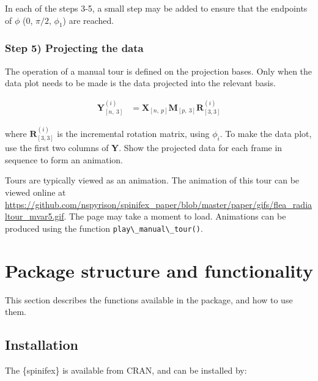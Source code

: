 \documentclass{template/monashthesis}
\begin{document}
In each of the steps 3-5, a small step may be added to ensure that the endpoints of \(\phi\) (\(0\), \(\pi/2\), \(\phi_1\)) are reached.

\hypertarget{sec:display}{%
\subsubsection{Step 5) Projecting the data}\label{sec:display}}

The operation of a manual tour is defined on the projection bases. Only when the data plot needs to be made is the data projected into the relevant basis.

\begin{align*}
  \textbf{Y}^{(i)}_{[n,~3]} &= \textbf{X}_{[n,~p]} \textbf{M}_{[p,~3]} \textbf{R}^{(i)}_{[3,3]}
\end{align*}

\noindent where \(\textbf{R}^{(i)}_{[3,3]}\) is the incremental rotation matrix, using \(\phi_i\). To make the data plot, use the first two columns of \textbf{Y}. Show the projected data for each frame in sequence to form an animation.

Tours are typically viewed as an animation. The animation of this tour can be viewed online at \url{https://github.com/nspyrison/spinifex_paper/blob/master/paper/gifs/flea_radialtour_mvar5.gif}. The page may take a moment to load. Animations can be produced using the function \texttt{play\textbackslash{}\_manual\textbackslash{}\_tour()}.

\hypertarget{package-structure-and-functionality}{%
\section{Package structure and functionality}\label{package-structure-and-functionality}}

This section describes the functions available in the package, and how to use them.

\hypertarget{installation}{%
\subsection{Installation}\label{installation}}

The \{spinifex\} is available from CRAN, and can be installed by:

\begin{Shaded}
\begin{Highlighting}[]
\NormalTok{(}\NormalTok{) }
\NormalTok{(}\NormalTok{) }

\NormalTok{(}\NormalTok{)}
\NormalTok{(}\NormalTok{)}
\end{Highlighting}
\end{Shaded}
\end{document}
